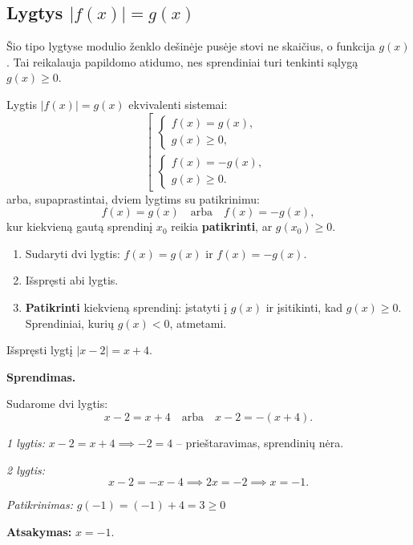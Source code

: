 \subsection{Lygtys \texorpdfstring{$|f(x)| = g(x)$}{|f(x)| = g(x)}}

Šio tipo lygtyse modulio ženklo dešinėje pusėje stovi ne skaičius, o funkcija $g(x)$. Tai reikalauja papildomo atidumo, nes sprendiniai turi tenkinti sąlygą $g(x) \geq 0$.

\begin{theorem}
Lygtis $|f(x)| = g(x)$ ekvivalenti sistemai:
\[
\left[
\begin{array}{l}
\begin{cases} f(x) = g(x), \\ g(x) \geq 0, \end{cases} \\[8pt]
\begin{cases} f(x) = -g(x), \\ g(x) \geq 0. \end{cases}
\end{array}
\right.
\]
arba, supaprastintai, dviem lygtims su patikrinimu:
\[
f(x) = g(x) \quad \text{arba} \quad f(x) = -g(x),
\]
kur kiekvieną gautą sprendinį $x_0$ reikia \textbf{patikrinti}, ar $g(x_0) \geq 0$.
\end{theorem}

\begin{tcolorbox}[colback=green!5!white, colframe=green!50!black, title={Sprendimo algoritmas: $|f(x)| = g(x)$}]
\begin{enumerate}
    \item Sudaryti dvi lygtis: $f(x) = g(x)$ ir $f(x) = -g(x)$.
    \item Išspręsti abi lygtis.
    \item \textbf{Patikrinti} kiekvieną sprendinį: įstatyti į $g(x)$ ir įsitikinti, kad $g(x) \geq 0$. Sprendiniai, kurių $g(x) < 0$, atmetami.
\end{enumerate}
\end{tcolorbox}

\begin{example}
Išspręsti lygtį $|x - 2| = x + 4$.

\textbf{Sprendimas.}

Sudarome dvi lygtis:
\[
x - 2 = x + 4 \quad \text{arba} \quad x - 2 = -(x + 4).
\]

\textit{1 lygtis:} $x - 2 = x + 4 \implies -2 = 4$ -- prieštaravimas, sprendinių nėra.

\textit{2 lygtis:}
\[
x - 2 = -x - 4 \implies 2x = -2 \implies x = -1.
\]

\textit{Patikrinimas:} $g(-1) = (-1) + 4 = 3 \geq 0$ \checkmark

\textbf{Atsakymas:} $x = -1$.
\end{example}

